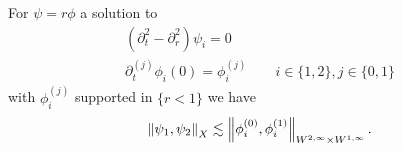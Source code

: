 \documentclass[11pt, oneside]{amsart}
\begin{document}
	
	\begin{lemma}\label{x bound for linear}
		For $\psi=r\phi$  a solution to
		\begin{equation*}
			\begin{gathered}
				(\partial_t^2-\partial_r^2)\psi_i=0\\
				\partial_t^{(j)}\phi_i(0)=\phi_i^{(j)}\qquad i\in\{1,2\},j\in\{0,1\}
			\end{gathered}
		\end{equation*}
		with $\phi_i^{(j)}$ supported in $\{r<1\}$ we have 
		\begin{equation*}
			\begin{gathered}
				\left\lVert \psi_1,\psi_2\right\rVert_X\lesssim \left\lVert \phi_i^{(0)},\phi_i^{(1)}\right\rVert_{W^{2,\infty}\times W^{1,\infty}}.
			\end{gathered}
		\end{equation*}
	\end{lemma}
\end{document}
